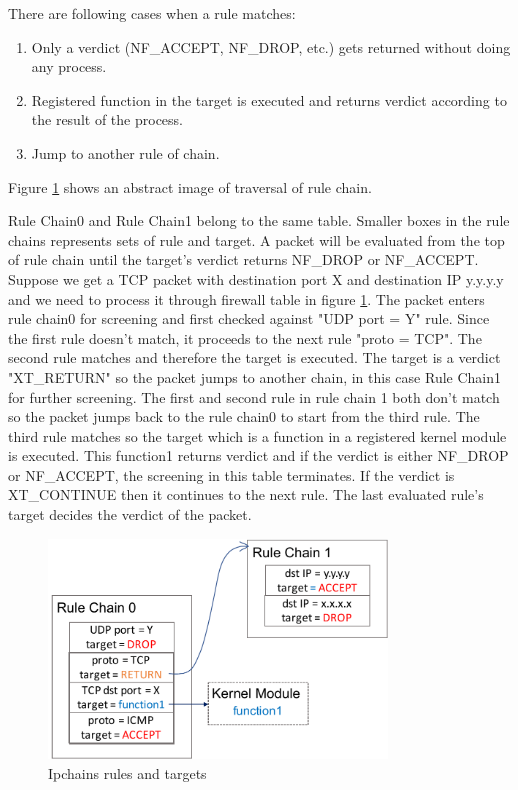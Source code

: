 There are following cases when a rule matches: 
\begin{enumerate}
\renewcommand{\labelenumi}{\arabic{enumi})}
	\item Only a verdict (NF\_ACCEPT, NF\_DROP, etc.) gets returned without doing any process.
	\item Registered function in the target is executed and returns verdict according to the result of the process.
	\item Jump to another rule of chain. 
\end{enumerate}

Figure \ref{fig: ip_chains} shows an abstract image of traversal of rule chain. 

Rule Chain0 and Rule Chain1 belong to the same table. Smaller boxes in the rule chains represents sets of rule and target. A packet will be evaluated from the top of rule chain until the target's verdict returns NF\_DROP or NF\_ACCEPT. Suppose we get a TCP packet with destination port X and destination IP y.y.y.y and we need to process it through firewall table in figure \ref{fig: ip_chains}. The packet enters rule chain0 for screening and first checked against "UDP port = Y" rule. Since the first rule doesn't match, it proceeds to the next rule "proto = TCP". The second rule matches and therefore the target is executed. The target is a verdict "XT\_RETURN" so the packet jumps to another chain, in this case Rule Chain1 for further screening. The first and second rule in rule chain 1 both don't match so the packet jumps back to the rule chain0 to start from the third rule. The third rule matches so the target  which is a function in a registered kernel module is executed. This function1 returns verdict and if the verdict is either NF\_DROP or NF\_ACCEPT, the screening in this table terminates. If the verdict is XT\_CONTINUE then it continues to the next rule. The last evaluated rule's target decides the verdict of the packet. 

\begin{figure}
	\centering
	\includegraphics[width=90mm]{pics/ip_chains.pdf}
	\caption{Ipchains rules and targets}
	\label{fig: ip_chains}
\end{figure}


